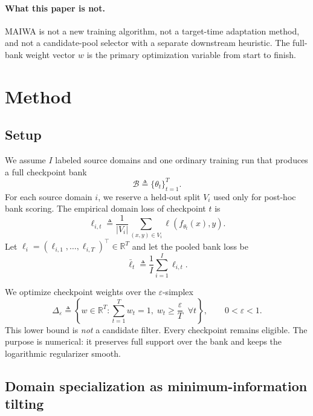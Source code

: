 \documentclass{article}
\newcommand{\RR}{\mathbb{R}}
\newcommand{\simplex}{\Delta}
\newcommand{\maiwa}{\textup{\textsc{MAIWA}}}
\newcommand{\bank}{\mathcal{B}}
\newcommand{\epssimplex}{\simplex_{\varepsilon}}
\begin{document}
\paragraph{What this paper is not.}
\maiwa{} is not a new training algorithm, not a target-time adaptation method, and not a candidate-pool selector with a separate downstream heuristic. The full-bank weight vector \(w\) is the primary optimization variable from start to finish.

\section{Method}
\label{sec:method}

\subsection{Setup}

We assume \(I\) labeled source domains and one ordinary training run that produces a full checkpoint bank
\begin{equation}
    \bank \triangleq \{\theta_t\}_{t=1}^{T}.
\end{equation}
For each source domain \(i\), we reserve a held-out split \(V_i\) used only for post-hoc bank scoring. The empirical domain loss of checkpoint \(t\) is
\begin{equation}
    \ell_{i,t}
    \triangleq
    \frac{1}{|V_i|}\sum_{(x,y)\in V_i}\ell\!\left(f_{\theta_t}(x),y\right).
\end{equation}
Let \(\ell_i = (\ell_{i,1},\dots,\ell_{i,T})^\top \in \RR^T\) and let the pooled bank loss be
\begin{equation}
    \bar \ell_t \triangleq \frac{1}{I}\sum_{i=1}^{I}\ell_{i,t}.
\end{equation}

We optimize checkpoint weights over the \(\varepsilon\)-simplex
\begin{equation}
    \epssimplex
    \triangleq
    \left\{
    w \in \RR^{T} :
    \sum_{t=1}^{T} w_t = 1,\;
    w_t \ge \frac{\varepsilon}{T}\;\; \forall t
    \right\},
    \qquad 0<\varepsilon<1.
\end{equation}
This lower bound is \emph{not} a candidate filter. Every checkpoint remains eligible. The purpose is numerical: it preserves full support over the bank and keeps the logarithmic regularizer smooth.

\subsection{Domain specialization as minimum-information tilting}
\end{document}
